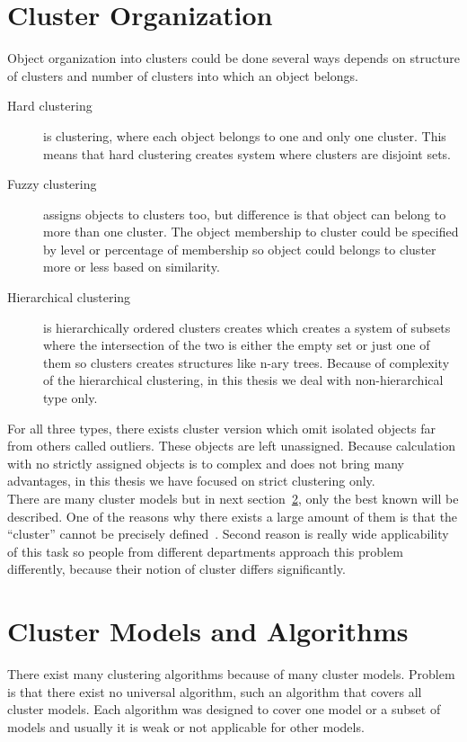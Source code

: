 \section{Cluster Organization} \label{sec:clusterorganization}
Object organization into clusters could be done several ways depends on structure of clusters and number of clusters into which an object belongs.
\begin{description}
\item[Hard clustering] is clustering, where each object belongs to one and only one cluster. This means that hard clustering creates system where clusters are disjoint sets.
\item[Fuzzy clustering] assigns objects to clusters too, but difference is that object can belong to more than one cluster. The object membership to cluster could be specified by level or percentage of membership so object could belongs to cluster more or less based on similarity.
\item[Hierarchical clustering] is hierarchically ordered clusters creates which creates a system of subsets where the intersection of the two is either the empty set or just one of them so clusters creates structures like n-ary trees. Because of complexity of the hierarchical clustering, in this thesis we deal with non-hierarchical type only.
\end{description}
For all three types, there exists cluster version which omit isolated objects far from others called outliers. These objects are left unassigned. Because calculation with no strictly assigned objects is to complex and does not bring many advantages, in this thesis we have focused on strict clustering only.\\

There are many cluster models but in next section~\ref{sec:clustermodels}, only the best known will be described. One of the reasons why there exists a large amount of them is that the ``cluster'' cannot be precisely defined~\cite{EstivillCastro02}. Second reason is really wide applicability of this task so people from different departments approach this problem differently, because their notion of cluster differs significantly. \\

\section{Cluster Models and Algorithms} \label{sec:clustermodels}
There exist many clustering algorithms because of many cluster models. Problem is that there exist no universal algorithm, such an algorithm that covers all cluster models. Each algorithm was designed to cover one model or a subset of models and usually it is weak or not applicable for other models.

